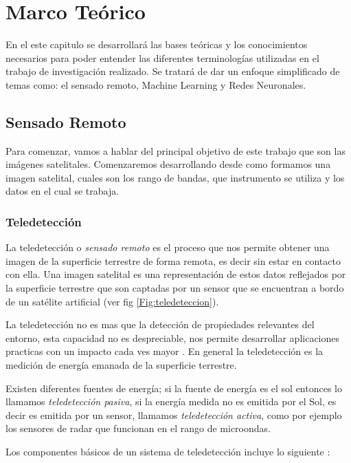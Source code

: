 \chapter{Marco Teórico} \label{chap:marcoteorico}

En el este capitulo se desarrollará las bases teóricas y los conocimientos necesarios para poder entender las diferentes terminologías utilizadas en el trabajo de investigación realizado. Se tratará de dar un enfoque simplificado de temas como: el sensado remoto,  Machine Learning y Redes Neuronales.

\section{Sensado Remoto}\label{sec:sensadoremoto}

Para comenzar, vamos a hablar del principal objetivo de este trabajo que son las imágenes satelitales. Comenzaremos desarrollando desde como formamos una imagen satelital, cuales son los rango de bandas, que instrumento se utiliza y los datos en el cual se trabaja.

\subsection{Teledetección}\label{sub:teledeteccion}

La teledetección o \textit{sensado remoto} es el proceso que nos permite obtener una imagen de la superficie terrestre de forma remota, es decir sin estar en contacto con ella. Una imagen satelital es una representación de estos datos reflejados por la superficie terrestre que son captadas por un sensor que se encuentran a bordo de un satélite artificial (ver fig \ref{Fig:teledeteccion}).

La teledetección no es mas que la detección de propiedades relevantes del entorno, esta capacidad no es despreciable, nos permite desarrollar aplicaciones practicas con un impacto cada ves mayor \citep{percepcion}. En general la teledetección es la medición de energía emanada de la superficie terrestre. 

Existen diferentes fuentes de energía; si la fuente de energía es el sol entonces lo llamamos \textit{teledetección pasiva}, si la energía medida no es emitida por el Sol, es decir es emitida por un sensor, llamamos \textit{teledetección activa}, como por ejemplo los sensores de radar que funcionan en el rango de microondas.

Los componentes básicos de un sistema de teledetección incluye lo siguiente \citep{chuvieco}:
